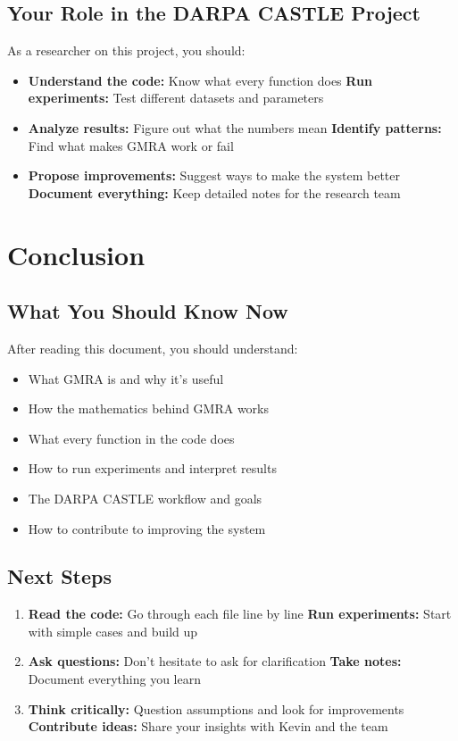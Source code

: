 \documentclass[12pt]{article}
\begin{document}
\subsection{Your Role in the DARPA CASTLE Project}

As a researcher on this project, you should:
\begin{itemize}
    \item \textbf{Understand the code:} Know what every function does
    \textbf{Run experiments:} Test different datasets and parameters
    \item \textbf{Analyze results:} Figure out what the numbers mean
    \textbf{Identify patterns:} Find what makes GMRA work or fail
    \item \textbf{Propose improvements:} Suggest ways to make the system better
    \textbf{Document everything:} Keep detailed notes for the research team
\end{itemize}

\section{Conclusion}

\subsection{What You Should Know Now}

After reading this document, you should understand:
\begin{itemize}
    \item What GMRA is and why it's useful
    \item How the mathematics behind GMRA works
    \item What every function in the code does
    \item How to run experiments and interpret results
    \item The DARPA CASTLE workflow and goals
    \item How to contribute to improving the system
\end{itemize}

\subsection{Next Steps}

\begin{enumerate}
    \item \textbf{Read the code:} Go through each file line by line
    \textbf{Run experiments:} Start with simple cases and build up
    \item \textbf{Ask questions:} Don't hesitate to ask for clarification
    \textbf{Take notes:} Document everything you learn
    \item \textbf{Think critically:} Question assumptions and look for improvements
    \textbf{Contribute ideas:} Share your insights with Kevin and the team
\end{enumerate}
\end{document}
